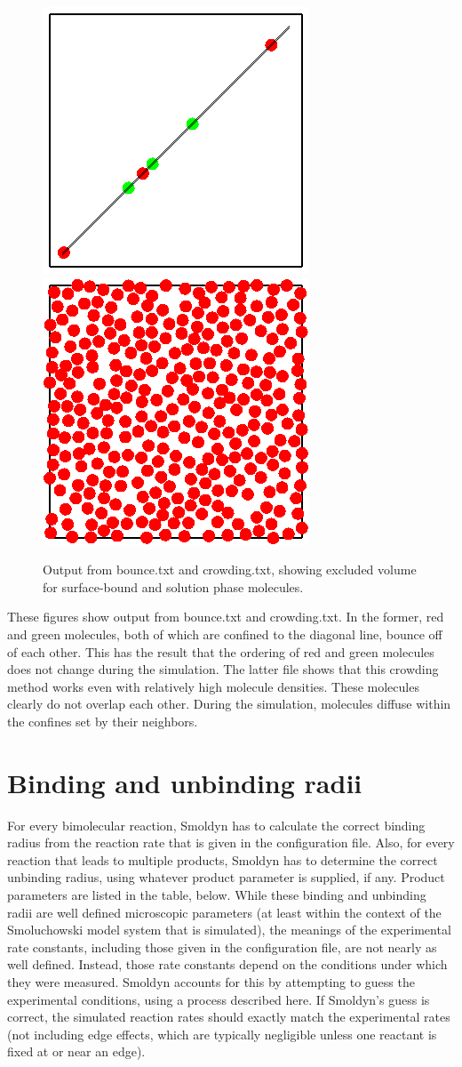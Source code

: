 \documentclass {scrbook}
\begin{document}
\begin{figure}[h]
\centering
\includegraphics[height=5 cm]{figures/image58.png}
\includegraphics[height=5 cm]{figures/image59.png}
\caption{Output from bounce.txt and crowding.txt, showing excluded volume for surface-bound and solution phase molecules.}
\label{fig:crowding}
\end{figure}

These figures show output from bounce.txt and crowding.txt. In the former, red and green molecules, both of which are confined to the diagonal line, bounce off of each other. This has the result that the ordering of red and green molecules does not change during the simulation. The latter file shows that this crowding method works even with relatively high molecule densities. These molecules clearly do not overlap each other. During the simulation, molecules diffuse within the confines set by their neighbors.

\section{Binding and unbinding radii}

For every bimolecular reaction, Smoldyn has to calculate the correct binding radius from the reaction rate that is given in the configuration file. Also, for every reaction that leads to multiple products, Smoldyn has to determine the correct unbinding radius, using whatever product parameter is supplied, if any. Product parameters are listed in the table, below. While these binding and unbinding radii are well defined microscopic parameters (at least within the context of the Smoluchowski model system that is simulated), the meanings of the experimental rate constants, including those given in the configuration file, are not nearly as well defined. Instead, those rate constants depend on the conditions under which they were measured. Smoldyn accounts for this by attempting to guess the experimental conditions, using a process described here. If Smoldyn's guess is correct, the simulated reaction rates should exactly match the experimental rates (not including edge effects, which are typically negligible unless one reactant is fixed at or near an edge).
\end{document}
